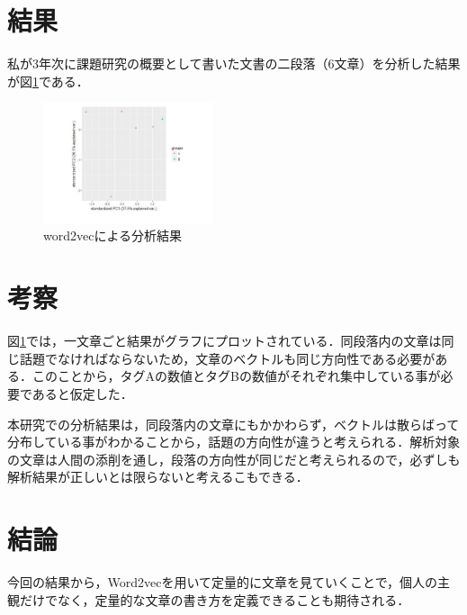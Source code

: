 \documentclass[uplatex,twocolumn,dvipdfmx]{jsarticle}
\begin{document}
\section{結果}
私が3年次に課題研究の概要として書いた文書の二段落（6文章）を分析した結果が図\ref{分析結果}である．
\begin{figure}[h]
\centering
\includegraphics[width=5cm]{02.pdf}
\caption{word2vecによる分析結果}\label{分析結果}
\end{figure}

\section{考察}
図\ref{分析結果}では，一文章ごと結果がグラフにプロットされている．同段落内の文章は同じ話題でなければならないため，文章のベクトルも同じ方向性である必要がある．このことから，タグAの数値とタグBの数値がそれぞれ集中している事が必要であると仮定した．

本研究での分析結果は，同段落内の文章にもかかわらず，ベクトルは散らばって分布している事がわかることから，話題の方向性が違うと考えられる．解析対象の文章は人間の添削を通し，段落の方向性が同じだと考えられるので，必ずしも解析結果が正しいとは限らないと考えるこもできる．

\section{結論}

今回の結果から，Word2vecを用いて定量的に文章を見ていくことで，個人の主観だけでなく，定量的な文章の書き方を定義できることも期待される．


\end{document}
